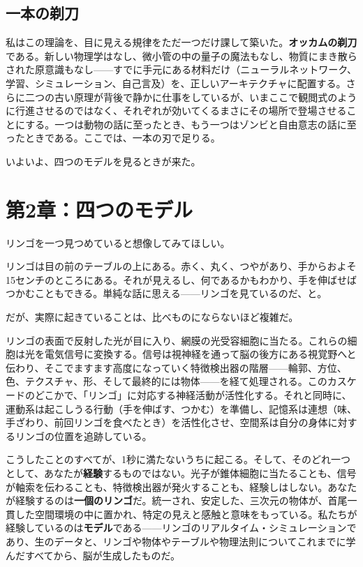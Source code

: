 \documentclass[11pt, twoside, openright]{book}
\begin{document}
\section*{一本の剃刀}

私はこの理論を、目に見える規律をただ一つだけ課して築いた。\textbf{オッカムの剃刀}である。新しい物理学はなし、微小管の中の量子の魔法もなし、物質にまき散らされた原意識もなし------すでに手元にある材料だけ（ニューラルネットワーク、学習、シミュレーション、自己言及）を、正しいアーキテクチャに配置する。さらに二つの古い原理が背後で静かに仕事をしているが、いまここで観閲式のように行進させるのではなく、それぞれが効いてくるまさにその場所で登場させることにする。一つは動物の話に至ったとき、もう一つはゾンビと自由意志の話に至ったときである。ここでは、一本の刃で足りる。

いよいよ、四つのモデルを見るときが来た。


\chapter*{第2章：四つのモデル}

リンゴを一つ見つめていると想像してみてほしい。

リンゴは目の前のテーブルの上にある。赤く、丸く、つやがあり、手からおよそ15センチのところにある。それが見えるし、何であるかもわかり、手を伸ばせばつかむこともできる。単純な話に思える------リンゴを見ているのだ、と。

だが、実際に起きていることは、比べものにならないほど複雑だ。

リンゴの表面で反射した光が目に入り、網膜の光受容細胞に当たる。これらの細胞は光を電気信号に変換する。信号は視神経を通って脳の後方にある視覚野へと伝わり、そこでますます高度になっていく特徴検出器の階層------輪郭、方位、色、テクスチャ、形、そして最終的には物体------を経て処理される。このカスケードのどこかで、「リンゴ」に対応する神経活動が活性化する。それと同時に、運動系は起こしうる行動（手を伸ばす、つかむ）を準備し、記憶系は連想（味、手ざわり、前回リンゴを食べたとき）を活性化させ、空間系は自分の身体に対するリンゴの位置を追跡している。

こうしたことのすべてが、1秒に満たないうちに起こる。そして、そのどれ一つとして、あなたが\textbf{経験}するものではない。光子が錐体細胞に当たることも、信号が軸索を伝わることも、特徴検出器が発火することも、経験しはしない。あなたが経験するのは\textbf{一個のリンゴ}だ。統一され、安定した、三次元の物体が、首尾一貫した空間環境の中に置かれ、特定の見えと感触と意味をもっている。私たちが経験しているのは\textbf{モデル}である------リンゴのリアルタイム・シミュレーションであり、生のデータと、リンゴや物体やテーブルや物理法則についてこれまでに学んだすべてから、脳が生成したものだ。
\end{document}
